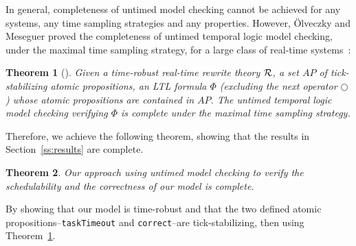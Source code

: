 \documentclass[10pt,journal]{IEEEtran}
\newtheorem{theorem}{Theorem}
\begin{document}
In general, completeness of untimed model checking cannot be achieved
for any systems, any time sampling strategies and any
properties. However, \"Olveczky and Meseguer proved the completeness
of untimed temporal logic model checking, under the maximal time
sampling strategy, for a large class of real-time
systems~\cite{DBLP:journals/entcs/OlveczkyM07a}:
\begin{theorem}[\cite{DBLP:journals/entcs/OlveczkyM07a}]
\label{t:completeness}
Given a \emph{time-robust} real-time rewrite theory $\cal R$, a set
$AP$ of \emph{tick-stabilizing} atomic propositions, an LTL formula
$\Phi$ (excluding the \emph{next} operator $\bigcirc$) whose atomic
propositions are contained in $AP$. The untimed temporal logic model
checking verifying $\Phi$ is \emph{complete} under the maximal time
sampling strategy.
\end{theorem}

Therefore, we achieve the following theorem, showing that the results
in Section~\ref{ss:results} are complete.
\begin{theorem}
\label{t:main}
Our approach using untimed model checking to verify the schedulability
and the correctness of our model is complete.
\end{theorem}
\begin{IEEEproof}
By showing that our model is time-robust and that the two defined
atomic propositions--\verb|taskTimeout| and \verb|correct|--are
tick-stabilizing, then using Theorem~\ref{t:completeness}.
\end{IEEEproof}
\end{document}
